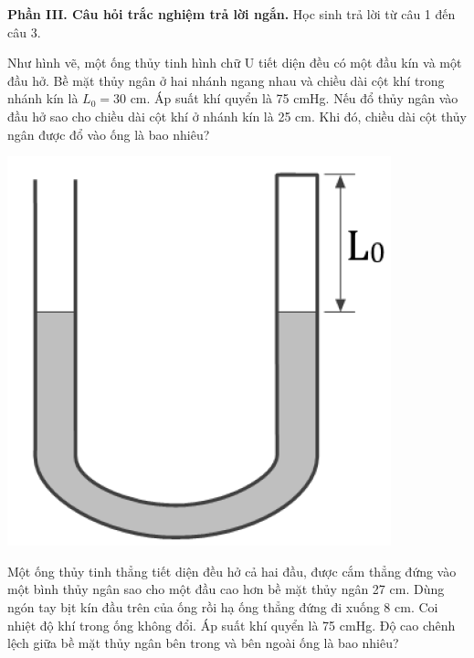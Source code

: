 \documentclass[12pt,a4paper]{article}
\begin{document}
\textbf{Phần III. Câu hỏi trắc nghiệm trả lời ngắn.} Học sinh trả lời từ câu 1 đến câu 3.
\setcounter{ex}{0}
\begin{ex}
	Như hình vẽ, một ống thủy tinh hình chữ U tiết diện đều có một đầu kín và một đầu hở. Bề mặt thủy ngân ở hai nhánh ngang nhau và chiều dài cột khí trong nhánh kín là $L_0 = 30$ cm. Áp suất khí quyển là 75 cmHg. Nếu đổ thủy ngân vào đầu hở sao cho chiều dài cột khí ở nhánh kín là 25 cm. Khi đó, chiều dài cột thủy ngân được đổ vào ống là bao nhiêu?
		\begin{center}
		\includegraphics[scale=0.3]{img/11.png}
	\end{center}
\end{ex}

\begin{ex}
	Một ống thủy tinh thẳng tiết diện đều hở cả hai đầu, được cắm thẳng đứng vào một bình thủy ngân sao cho một đầu cao hơn bề mặt thủy ngân 27 cm. Dùng ngón tay bịt kín đầu trên của ống rồi hạ ống thẳng đứng đi xuống 8 cm. Coi nhiệt độ khí trong ống không đổi. Áp suất khí quyển là 75 cmHg. Độ cao chênh lệch giữa bề mặt thủy ngân bên trong và bên ngoài ống là bao nhiêu?
\end{ex}
\end{document}
